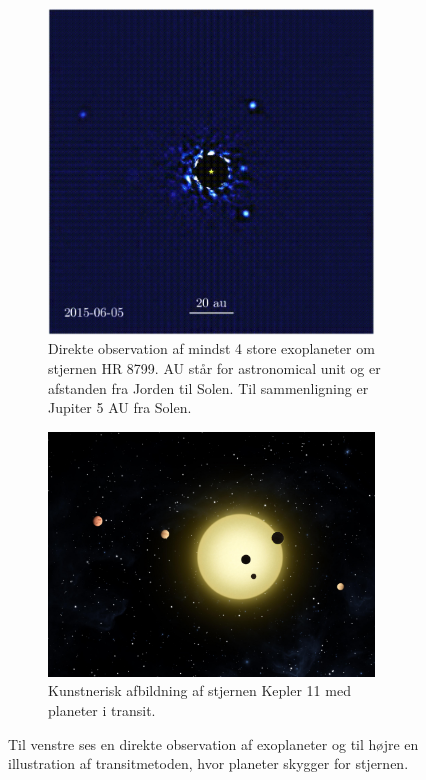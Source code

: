 \begin{figure}[h!]
    \centering
    \begin{subfigure}{.45\textwidth}
        \centering
        \includegraphics[width = 0.95\textwidth]{Astrofysik/billeder/Direct_imaging_image.PNG} 
        \caption{Direkte observation af mindst 4 store exoplaneter om stjernen HR 8799. AU står for astronomical unit og er afstanden fra Jorden til Solen. Til sammenligning er Jupiter 5 AU fra Solen.}
        \label{DI}
    \end{subfigure}
    \hspace{5mm}
    \begin{subfigure}{.45\textwidth}
        \centering
        \includegraphics[width = 0.95\textwidth]{Astrofysik/billeder/Kepler11.png} 
        \caption{Kunstnerisk afbildning af stjernen Kepler 11 med planeter i transit.}
        \label{Kepler11}
    \end{subfigure}
    \caption{Til venstre ses en direkte observation af exoplaneter og til højre en illustration af transitmetoden, hvor planeter skygger for stjernen.}
\end{figure}

